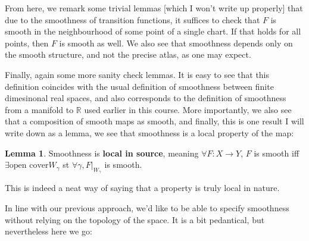 \documentclass{article}
\theoremstyle{definition}
\newtheorem{lemma}{Lemma}
\begin{document}
From here, we remark some trivial lemmas [which I won't write up properly] that
due to the smoothness of transition functions, it suffices to check that $F$ is
smooth in the neighbourhood of some point of a single chart. If that holds for
all points, then $F$ is smooth as well. We also see that smoothness depends only
on the smooth structure, and not the precise atlas, as one may expect.

Finally, again some more sanity check lemmas. It is easy to see that this
definition coincides with the usual definition of smoothness between finite
dimesinonal real spaces, and also corresponds to the definition of smoothness
from a manifold to $\mathbb{R}$ used earlier in this course. More importantly,
we also see that a composition of smooth maps as smooth, and finally, this is
one result I will write down as a lemma, we see that smoothness is a local
property of the map:

\begin{lemma}
Smoothness is \textbf{local in source}, meaning $\forall F: X \to Y$, $F$ is
smooth iff $\exists \text{open cover} W_\gamma$ st $\forall \gamma, F
|_{W_\gamma}$ is smooth.
\end{lemma}

This is indeed a neat way of saying that a property is truly local in nature. 

In line with our previous approach, we'd like to be able to specify smoothness
without relying on the topology of the space. It is a bit pedantical, but
nevertheless here we go:
\end{document}
